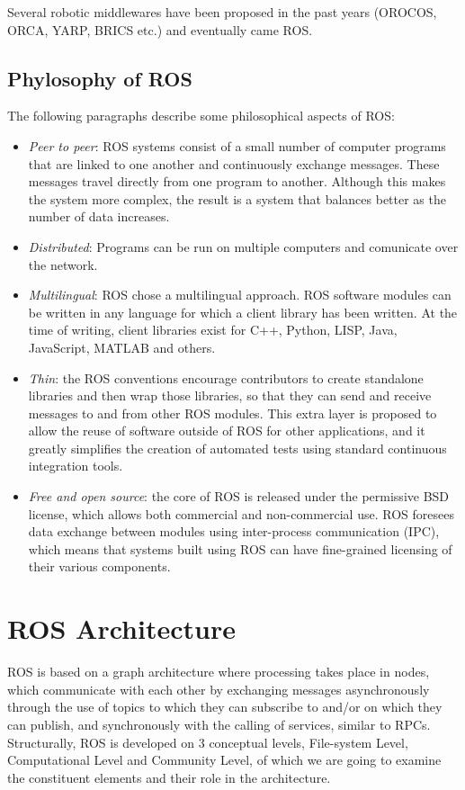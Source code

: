  Several robotic middlewares have been proposed in the past years (OROCOS, ORCA, YARP, BRICS etc.) and eventually came ROS.
 
 \subsection{Phylosophy of ROS}
The following paragraphs describe some philosophical aspects of ROS:\\
\begin{itemize}
\item \textit{Peer to peer}: ROS systems consist of a small number of computer programs that are linked to one another and continuously exchange messages. These messages travel directly from one program to another. Although this makes the system more complex, the result is a system that balances better as the number of data increases.\\
\item \textit{Distributed}: Programs can be run on multiple computers and comunicate over the network.
\item \textit{Multilingual}: ROS chose a multilingual approach. ROS software modules can be written in any language for which a client library has been written. At the time of writing, client libraries exist for C++, Python, LISP, Java, JavaScript, MATLAB and others.\\
\item \textit{Thin}: the ROS conventions encourage contributors to create standalone libraries and then wrap those libraries, so that they can send and receive messages to and from other ROS modules. This extra layer is proposed to allow the reuse of software outside of ROS for other applications, and it greatly simplifies the creation of automated tests using standard continuous integration tools.\\
\item \textit{Free and open source}: the core of ROS is released under the permissive BSD license, which allows both commercial and non-commercial use. ROS foresees data exchange between modules using inter-process communication (IPC), which means that systems built using ROS can have fine-grained licensing of their various components.\\
\end{itemize}

\section{ROS Architecture}
ROS is based on a graph architecture where processing takes place in nodes, which communicate with each other by exchanging messages asynchronously through the use of topics to which they can subscribe to and/or on which they can publish, and synchronously with the calling of services, similar to RPCs.  Structurally, ROS is developed on 3 conceptual levels, File-system Level, Computational Level and Community Level, of which we are going to examine the constituent elements and their role in the architecture.

